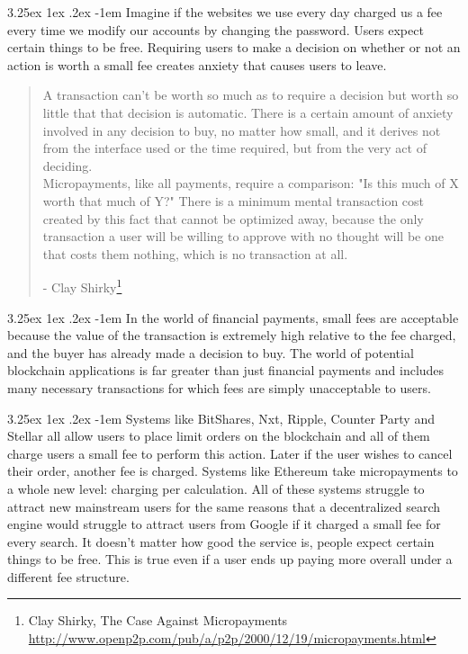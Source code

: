 \documentclass{article}
\makeatletter
\renewcommand\paragraph{\@startsection{paragraph}{5}{\z@}%
  {3.25ex \@plus1ex \@minus.2ex}%
  {-1em}%
  {\normalfont\normalsize\bfseries}}
\makeatother
\begin{document}
                \paragraph{}
                    Imagine if the websites we use every day charged us a
fee every time we modify our accounts by changing the password. Users
expect certain things to be free. Requiring users to make a decision on
whether or not an action is worth a small fee creates anxiety that causes
users to leave.

                \begin{quote}
                        A transaction can't be worth so much as to require
a decision but worth so little that that decision is automatic. There is a
certain amount of anxiety involved in any decision to buy, no matter how
small, and it derives not from the interface used or the time required, but
from the very act of deciding.\\

                        Micropayments, like all payments, require a
comparison: "Is this much of X worth that much of Y?" There is a minimum
mental transaction cost created by this fact that cannot be optimized away,
because the only transaction a user will be willing to approve with no
thought will be one that costs them nothing, which is no transaction at
all.

                        - Clay Shirky\protect\footnote{Clay Shirky, The
Case Against Micropayments\newline
\url{http://www.openp2p.com/pub/a/p2p/2000/12/19/micropayments.html}}\\
                \end{quote}

                \paragraph{}
                    In the world of financial payments, small fees are
acceptable because the value of the transaction is extremely high relative
to the fee charged, and the buyer has already made a decision to buy. The
world of potential blockchain applications is far greater than just
financial payments and includes many necessary transactions for which fees
are simply unacceptable to users.

                \paragraph{}
                    Systems like BitShares, Nxt, Ripple, Counter Party and
Stellar all allow users to place limit orders on the blockchain and all of
them charge users a small fee to perform this action. Later if the user
wishes to cancel their order, another fee is charged. Systems like Ethereum
take micropayments to a whole new level: charging per calculation. All of
these systems struggle to attract new mainstream users for the same reasons
that a decentralized search engine would struggle to attract users from
Google if it charged a small fee for every search. It doesn't matter how
good the service is, people expect certain things to be free. This is true
even if a user ends up paying more overall under a different fee structure.
\end{document}
